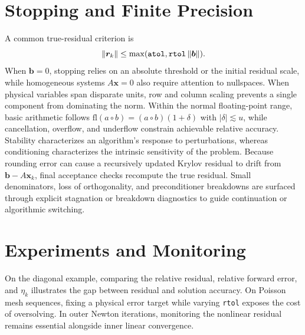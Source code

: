 \section{Stopping and Finite Precision}
A common true-residual criterion is
\[
 \left\lVert \bm r_k\right\rVert\le
 \max(\texttt{atol},\texttt{rtol}\left\lVert \bm b\right\rVert).
\]
When $\bm b=0$, stopping relies on an absolute threshold or the initial residual scale, while homogeneous systems $A\bm x=0$ also require attention to nullspaces. When physical variables span disparate units, row and column scaling prevents a single component from dominating the norm.
Within the normal floating-point range, basic arithmetic follows $\mathrm{fl}(a\circ b)=(a\circ b)(1+\delta)$ with $|\delta|\lesssim u$, while cancellation, overflow, and underflow constrain achievable relative accuracy. Stability characterizes an algorithm's response to perturbations, whereas conditioning characterizes the intrinsic sensitivity of the problem.
Because rounding error can cause a recursively updated Krylov residual to drift from $\bm b-A\bm x_k$, final acceptance checks recompute the true residual. Small denominators, loss of orthogonality, and preconditioner breakdowns are surfaced through explicit stagnation or breakdown diagnostics to guide continuation or algorithmic switching.
\section{Experiments and Monitoring}
On the diagonal example, comparing the relative residual, relative forward error, and $\eta_k$ illustrates the gap between residual and solution accuracy. On Poisson mesh sequences, fixing a physical error target while varying \texttt{rtol} exposes the cost of oversolving. In outer Newton iterations, monitoring the nonlinear residual remains essential alongside inner linear convergence.
